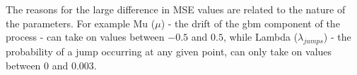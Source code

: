 \documentclass[11pt,oneside,openany,a4paper,english, report, goldenblock
]{usthesis}
\begin{document}
The reasons for the large difference in MSE values are related to the nature of the parameters. For example Mu ($\mu$) - the drift of the \acrshort{gbm} component of the process - can take on values between $-0.5$ and $0.5$, while Lambda ($\lambda_{jumps}$) - the probability of a jump occurring at any given point, can only take on values between $0$ and $0.003$.

\begin{figure}[h]
\end{figure}
\end{document}
